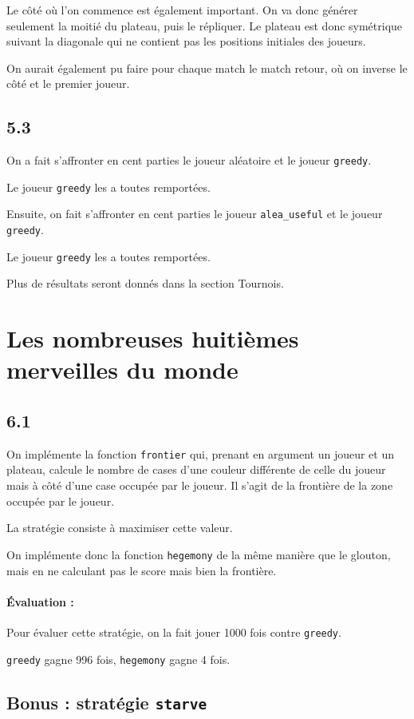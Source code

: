 \documentclass[12pt]{article}
\def\question#1{\subsection*{#1}}
\def\sec#1{\section{#1}}
\begin{document}
Le côté où l'on commence est également important. On va donc générer seulement la moitié du plateau, puis le répliquer. Le plateau est donc symétrique suivant la diagonale qui ne contient pas les positions initiales des joueurs.

On aurait également pu faire pour chaque match le match retour, où on inverse le côté et le premier joueur.

\question{5.3}
On a fait s'affronter en cent parties le joueur aléatoire et le joueur \texttt{greedy}.

Le joueur \texttt{greedy} les a toutes remportées.

Ensuite, on fait s'affronter en cent parties le joueur \texttt{alea\_useful} et le joueur \texttt{greedy}.

Le joueur \texttt{greedy} les a toutes remportées.

Plus de résultats seront donnés dans la section Tournois.

\sec{Les nombreuses huitièmes merveilles du monde}

\question{6.1}
On implémente la fonction \texttt{frontier} qui, prenant en argument un joueur et un plateau, calcule le nombre de cases d'une couleur différente de celle du joueur mais à côté d'une case occupée par le joueur.
Il s'agit de la frontière de la zone occupée par le joueur.

La stratégie consiste à maximiser cette valeur.

On implémente donc la fonction \texttt{hegemony} de la même manière que le glouton, mais en ne calculant pas le score mais bien la frontière.



\paragraph{Évaluation :}
Pour évaluer cette stratégie, on la fait jouer 1000 fois contre \texttt{greedy}.

\texttt{greedy} gagne 996 fois, \texttt{hegemony} gagne 4 fois.

\question{Bonus : stratégie \texttt{starve}}
\end{document}
